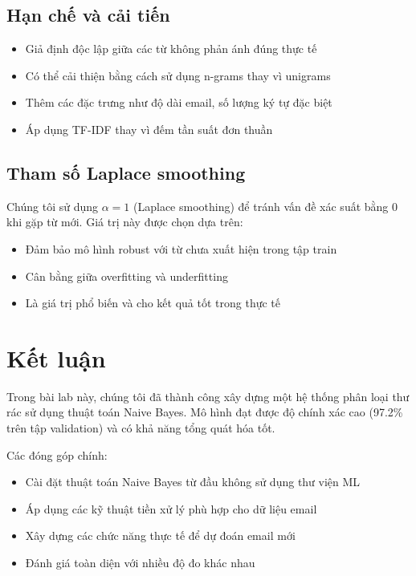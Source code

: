 \subsection{Hạn chế và cải tiến}
\begin{itemize}
    \item Giả định độc lập giữa các từ không phản ánh đúng thực tế
    \item Có thể cải thiện bằng cách sử dụng n-grams thay vì unigrams
    \item Thêm các đặc trưng như độ dài email, số lượng ký tự đặc biệt
    \item Áp dụng TF-IDF thay vì đếm tần suất đơn thuần
\end{itemize}

\subsection{Tham số Laplace smoothing}
Chúng tôi sử dụng $\alpha = 1$ (Laplace smoothing) để tránh vấn đề xác suất bằng 0 khi gặp từ mới. Giá trị này được chọn dựa trên:
\begin{itemize}
    \item Đảm bảo mô hình robust với từ chưa xuất hiện trong tập train
    \item Cân bằng giữa overfitting và underfitting
    \item Là giá trị phổ biến và cho kết quả tốt trong thực tế
\end{itemize}

\section{Kết luận}

Trong bài lab này, chúng tôi đã thành công xây dựng một hệ thống phân loại thư rác sử dụng thuật toán Naive Bayes. Mô hình đạt được độ chính xác cao (97.2\% trên tập validation) và có khả năng tổng quát hóa tốt. 

Các đóng góp chính:
\begin{itemize}
    \item Cài đặt thuật toán Naive Bayes từ đầu không sử dụng thư viện ML
    \item Áp dụng các kỹ thuật tiền xử lý phù hợp cho dữ liệu email
    \item Xây dựng các chức năng thực tế để dự đoán email mới
    \item Đánh giá toàn diện với nhiều độ đo khác nhau
\end{itemize}

